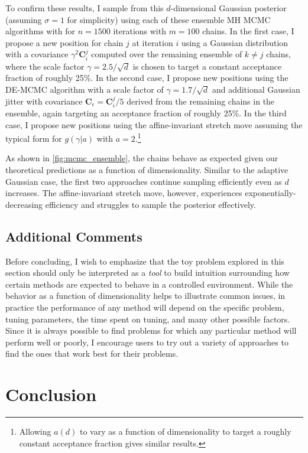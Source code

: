 \documentclass[12pt, titlepage]{article}
\newcommand{\cov}{\ensuremath{\mathbf{C}}}
\begin{document}
To confirm these results, I sample from this $d$-dimensional
Gaussian posterior (assuming $\sigma=1$ for simplicity) 
using each of these ensemble MH MCMC algorithms with for $n=1500$
iterations with $m=100$ chains.
In the first case, I propose a new position for chain $j$ 
at iteration $i$ using a Gaussian distribution with
a covariance $\gamma^2 \cov_i^j$ computed over the remaining ensemble of
$k \neq j$ chains, where the scale factor $\gamma=2.5/\sqrt{d}$ is
chosen to target a constant acceptance fraction of roughly 25\%. 
In the second case, I propose new positions using the DE-MCMC algorithm
with a scale factor of $\gamma=1.7/\sqrt{d}$ 
and additional Gaussian jitter with covariance $\cov_\epsilon = \cov_i^j / 5$
derived from the remaining chains in the ensemble, again targeting
an acceptance fraction of roughly 25\%.
In the third case, I propose new positions using the affine-invariant stretch
move assuming the typical form for $g(\gamma|a)$ with $a=2$.\footnote{Allowing
$a(d)$ to vary as a function of dimensionality to target a roughly constant
acceptance fraction gives similar results.}

As shown in {\color{red} \autoref{fig:mcmc_ensemble}}, the chains
behave as expected given our theoretical predictions as a function
of dimensionality. Similar to the adaptive Gaussian case,
the first two approaches continue 
sampling efficiently even as $d$ increases. The affine-invariant
stretch move, however, experiences exponentially-decreasing efficiency
and struggles to sample the posterior effectively.

\subsection{Additional Comments} \label{subsec:comments}

Before concluding, I wish to emphasize that the toy problem explored in this
section should only be interpreted as a \textit{tool} to build intuition surrounding
how certain methods are expected to behave in a controlled environment.
While the behavior as a function of dimensionality
helps to illustrate common issues, in practice 
the performance of any method will depend on the specific problem, tuning parameters,
the time spent on tuning, and many other possible factors. Since it is always possible
to find problems for which any particular method
will perform well or poorly, I encourage users to try out a variety of
approaches to find the ones that work best for their problems.

\section{Conclusion} \label{sec:conc}
\end{document}
